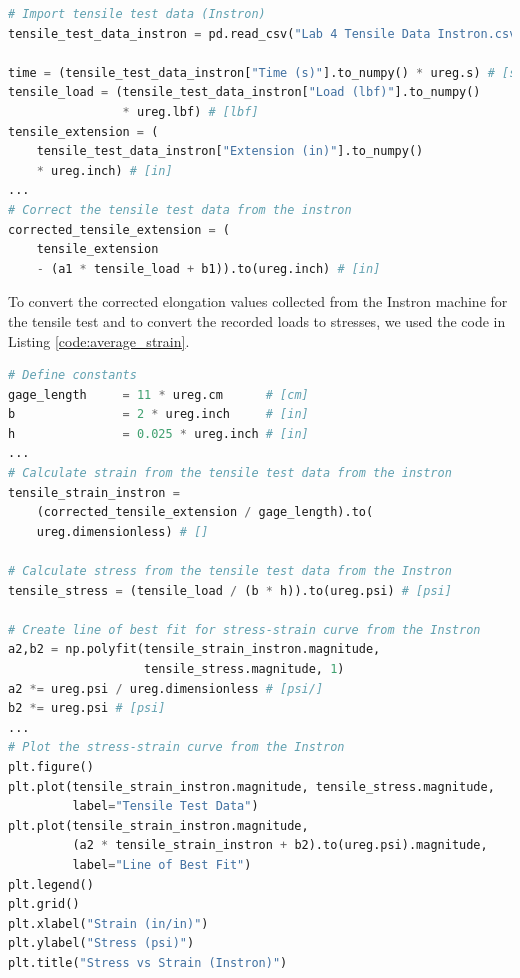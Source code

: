 \documentclass[12 pt]{report}
\begin{document}
\begin{parlist}
	\begin{lstlisting}[label={code:corrected_elongation}, caption={The code used to correct the elongation values collected from the Instron machine during the tensile test.},language=Python]
# Import tensile test data (Instron)
tensile_test_data_instron = pd.read_csv("Lab 4 Tensile Data Instron.csv")

time = (tensile_test_data_instron["Time (s)"].to_numpy() * ureg.s) # [s]
tensile_load = (tensile_test_data_instron["Load (lbf)"].to_numpy()
                * ureg.lbf) # [lbf]
tensile_extension = (
    tensile_test_data_instron["Extension (in)"].to_numpy()
    * ureg.inch) # [in]
...
# Correct the tensile test data from the instron
corrected_tensile_extension = (
    tensile_extension
    - (a1 * tensile_load + b1)).to(ureg.inch) # [in]\end{lstlisting}
    
    \item To convert the corrected elongation values collected from the Instron machine for the tensile test and to convert the recorded loads to stresses, we used the code in Listing \ref{code:average_strain}.
    
    \begin{lstlisting}[label={code:average_strain}, caption={The code used to convert the corrected elongations values into strains and the recorded loads into stresses.},language=Python]
# Define constants
gage_length     = 11 * ureg.cm      # [cm]
b               = 2 * ureg.inch     # [in]
h               = 0.025 * ureg.inch # [in]
...
# Calculate strain from the tensile test data from the instron
tensile_strain_instron =
	(corrected_tensile_extension / gage_length).to(
    ureg.dimensionless) # []

# Calculate stress from the tensile test data from the Instron
tensile_stress = (tensile_load / (b * h)).to(ureg.psi) # [psi]

# Create line of best fit for stress-strain curve from the Instron
a2,b2 = np.polyfit(tensile_strain_instron.magnitude,
                   tensile_stress.magnitude, 1)
a2 *= ureg.psi / ureg.dimensionless # [psi/]
b2 *= ureg.psi # [psi]
...
# Plot the stress-strain curve from the Instron
plt.figure()
plt.plot(tensile_strain_instron.magnitude, tensile_stress.magnitude,
         label="Tensile Test Data")
plt.plot(tensile_strain_instron.magnitude,
         (a2 * tensile_strain_instron + b2).to(ureg.psi).magnitude,
         label="Line of Best Fit")
plt.legend()
plt.grid()
plt.xlabel("Strain (in/in)")
plt.ylabel("Stress (psi)")
plt.title("Stress vs Strain (Instron)")\end{lstlisting}


\end{parlist}
\end{document}
